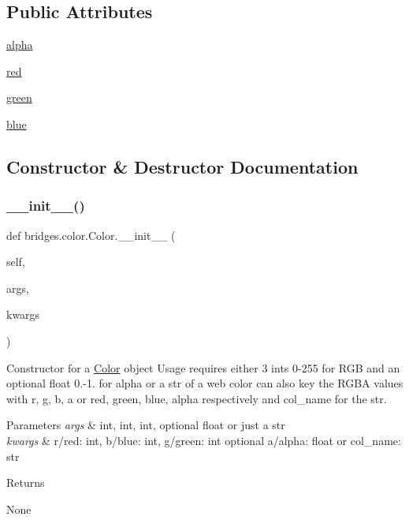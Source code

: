 \subsection*{Public Attributes}
\begin{DoxyCompactItemize}
\item 
\hyperlink{classbridges_1_1color_1_1_color_a2e170f068eeb77ace0427d23b36f2b27}{alpha}
\item 
\hyperlink{classbridges_1_1color_1_1_color_abb0aa417808af0140d3448a2e49d2d15}{red}
\item 
\hyperlink{classbridges_1_1color_1_1_color_a6f14b2d3ec82052c1aeb259ee687059d}{green}
\item 
\hyperlink{classbridges_1_1color_1_1_color_a2c5081c47a43419bb1c5dbbd9c72a21e}{blue}
\end{DoxyCompactItemize}


\subsection{Constructor \& Destructor Documentation}
\mbox{\label{classbridges_1_1color_1_1_color_aacbbede0aceb8f1ca36d78379614bb1a}} 
\subsubsection{\texorpdfstring{\+\_\+\+\_\+init\+\_\+\+\_\+()}{\_\_init\_\_()}}
{\footnotesize\ttfamily def bridges.\+color.\+Color.\+\_\+\+\_\+init\+\_\+\+\_\+ (\begin{DoxyParamCaption}\item[{}]{self,  }\item[{}]{args,  }\item[{}]{kwargs }\end{DoxyParamCaption})}



Constructor for a \hyperlink{classbridges_1_1color_1_1_color}{Color} object Usage requires either 3 ints 0-\/255 for R\+GB and an optional float 0.-\/1. for alpha or a str of a web color can also key the R\+G\+BA values with r, g, b, a or red, green, blue, alpha respectively and col\+\_\+name for the str. 


\begin{DoxyParams}{Parameters}
{\em args} & int, int, int, optional float or just a str \\
\hline
{\em kwargs} & r/red\+: int, b/blue\+: int, g/green\+: int optional a/alpha\+: float or col\+\_\+name\+: str \\
\hline
\end{DoxyParams}
\begin{DoxyReturn}{Returns}


None 
\end{DoxyReturn}


